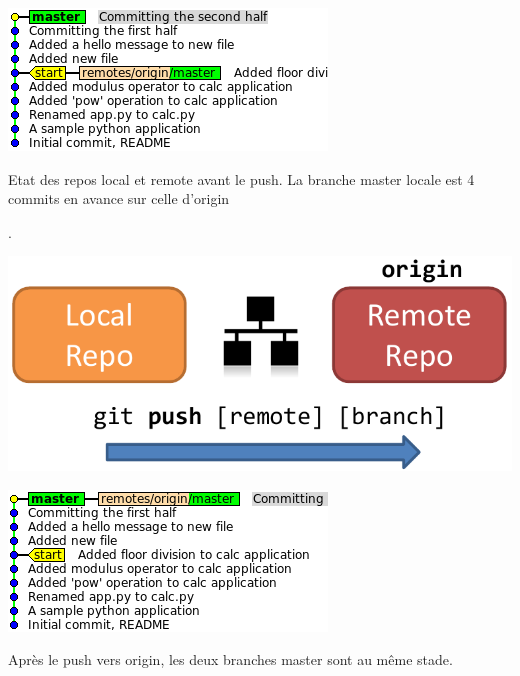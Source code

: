 \documentclass{../../common/tufte-latex/tufte-handout}
\begin{document}
\begin{marginfigure}%
  \centering
  \includegraphics[width=\linewidth]{gitcommit-pre-push.png}
  \label{fig:gitcommit-pre-push}
  \caption{Etat des repos local et remote avant le push. La branche master locale est 4 commits en avance sur celle d'origin}.
\end{marginfigure}
\begin{marginfigure}%
  \centering
  \includegraphics[width=\linewidth]{gitpush-schema.pdf}
  \label{fig:gitpush-schema}
\end{marginfigure}
\begin{marginfigure}%
  \centering
  \includegraphics[width=\linewidth]{gitcommit-post-push.png}
  \label{fig:gitcommit-post-push}
  \caption{Après le push vers origin, les deux branches master sont au même stade.}
\end{marginfigure}
\end{document}
